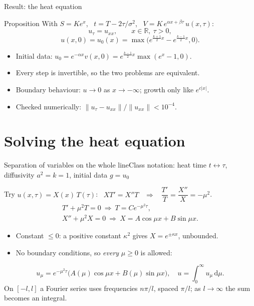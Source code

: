 \documentclass[11pt]{beamer}
\newcommand{\dd}{\,\mathrm d}
\begin{document}
\begin{frame}{Result: the heat equation}
  \begin{block}{Proposition}
    With $S=Ke^x$, \ $t=T-2\tau/\sigma^2$, \ $V=K\,e^{\alpha x+\beta\tau}\,u(x,\tau)$:
    \[
      u_\tau=u_{xx},\qquad x\in\mathbb R,\ \tau>0,
    \]
    \[
      u(x,0)=u_0(x)=\max\big(e^{\frac{k+1}{2}x}-e^{\frac{k-1}{2}x},0\big).
    \]
  \end{block}
  \begin{itemize}
    \item Initial data: $u_0=e^{-\alpha x}v(x,0)=e^{\frac{k-1}2x}\max(e^x-1,0)$.
    \item Every step is invertible, so the two problems are equivalent.
    \item Boundary behaviour: $u\to0$ as $x\to-\infty$; growth only like $e^{c|x|}$.
    \item Checked numerically: $\|u_\tau-u_{xx}\|/\|u_{xx}\|<10^{-4}$.
  \end{itemize}
\end{frame}

\section{Solving the heat equation}

\begin{frame}{Separation of variables on the whole line}{Class notation: heat time $t\leftrightarrow\tau$, diffusivity $a^2=k=1$, initial data $g=u_0$}

  Try $u(x,\tau)=X(x)\,T(\tau)$: \ $XT'=X''T$ \ $\Rightarrow$ \ $\dfrac{T'}{T}=\dfrac{X''}{X}=-\mu^2$.
  \begin{gather*}
    T'+\mu^2T=0\ \Rightarrow\ T=Ce^{-\mu^2\tau},\\
    X''+\mu^2X=0\ \Rightarrow\ X=A\cos\mu x+B\sin\mu x .
  \end{gather*}
  \begin{itemize}
    \item Constant $\le0$: a positive constant $\kappa^2$ gives $X=e^{\pm\kappa x}$, unbounded.
    \item No boundary conditions, so \emph{every} $\mu\ge0$ is allowed:
  \end{itemize}
  \[
    u_\mu=e^{-\mu^2\tau}\big(A(\mu)\cos\mu x+B(\mu)\sin\mu x\big),\quad
    u=\int_0^\infty u_\mu\dd\mu .
  \]
  {\small On $[-l,l]$ a Fourier series uses frequencies $n\pi/l$, spaced $\pi/l$; as $l\to\infty$ the sum
  becomes an integral.}
\end{frame}
\end{document}
